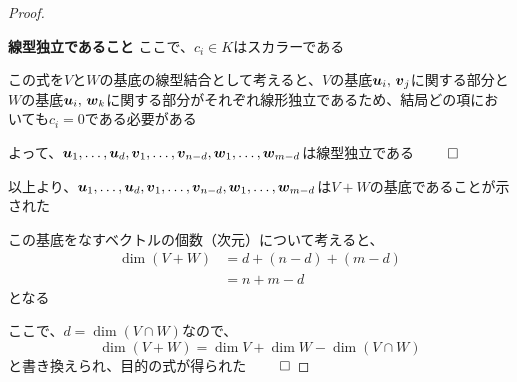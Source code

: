 \documentclass[../../../topic_linear-algebra]{subfiles}
\begin{document}
\begin{proof}
\begin{subpattern}{\bfseries 線型独立であること}
    ここで、$c_i \in K$はスカラーである

    \br

    この式を$V$と$W$の基底の線型結合として考えると、$V$の基底$\vb*{u}_i, \, \vb*{v}_j$に関する部分と$W$の基底$\vb*{u}_i, \, \vb*{w}_k$に関する部分がそれぞれ線形独立であるため、結局どの項においても$c_i = 0$である必要がある

    \br

    よって、$\vb*{u}_1, \dots, \vb*{u}_d, \vb*{v}_1, \dots, \vb*{v}_{n-d}, \vb*{w}_1, \dots, \vb*{w}_{m-d}$は線型独立である $\qed$
  \end{subpattern}

  \br

  以上より、$\vb*{u}_1, \dots, \vb*{u}_d, \vb*{v}_1, \dots, \vb*{v}_{n-d}, \vb*{w}_1, \dots, \vb*{w}_{m-d}$は$V + W$の基底であることが示された

  \br

  この基底をなすベクトルの個数（次元）について考えると、
  \begin{align*}
    \dim(V + W) & = d + (n - d) + (m - d) \\
                & = n + m - d
  \end{align*}
  となる

  ここで、$d = \dim(V \cap W)$なので、
  \begin{equation*}
    \dim(V + W) = \dim V + \dim W - \dim(V \cap W)
  \end{equation*}
  と書き換えられ、目的の式が得られた $\qed$
\end{proof}
\end{document}
